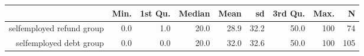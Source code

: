 \begin{table}[ht]
\centering
\begin{tabular}{rrrrrrrrr}
  \hline
 & Min. & 1st Qu. & Median & Mean & sd & 3rd Qu. & Max. & N \\ 
  \hline
selfemployed refund group & 0.0 & 1.0 & 20.0 & 28.9 & 32.2 & 50.0 & 100 & 74 \\ 
  selfemployed debt group & 0.0 & 0.0 & 20.0 & 32.0 & 32.6 & 50.0 & 100 & 105 \\ 
   \hline
\end{tabular}
\end{table}
